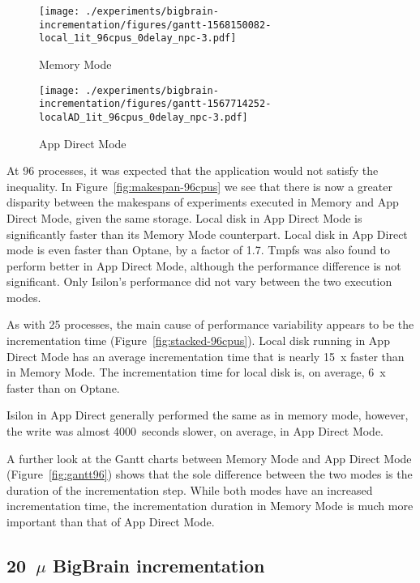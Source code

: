 \documentclass[conference]{IEEEtran}
\newcommand{\bigbrain}{BigBrain\xspace}
\begin{document}
\begin{figure*}
    \begin{subfigure}{\columnwidth}
        \centering
    \texttt{[image: ./experiments/bigbrain-incrementation/figures/gantt-1568150082-local\_1it\_96cpus\_0delay\_npc-3.pdf]}
    \caption{Memory Mode}
\end{subfigure}
\begin{subfigure}{\columnwidth}
        \centering
    \texttt{[image: ./experiments/bigbrain-incrementation/figures/gantt-1567714252-localAD\_1it\_96cpus\_0delay\_npc-3.pdf]}
    \caption{App Direct Mode}
\end{subfigure}
\caption{Gantt charts for local disk processing 125 blocks of the 40$\mu$m BigBrain using 96 processes with no delay}\label{fig:gantt96}
\end{figure*}

At 96 processes, it was expected that the application would not satisfy the inequality.
In Figure~\ref{fig:makespan-96cpus} we see that there is now a greater disparity between the
makespans of experiments executed in Memory and App Direct Mode, given the same storage. Local disk
in App Direct Mode is significantly faster than its Memory Mode counterpart. Local disk in App Direct
mode is even faster than Optane, by a factor of 1.7. Tmpfs was also found to perform better in App Direct Mode, although
the performance difference is not significant. Only Isilon's performance did not vary between the
two execution modes.

As with 25 processes, the main cause of performance variability appears to be the incrementation
time (Figure~\ref{fig:stacked-96cpus}). Local disk running in App Direct Mode has an average
incrementation time that is nearly 15~x faster than in Memory Mode. The incrementation time
for local disk is, on average, 6~x faster than on Optane.

Isilon in App Direct generally performed the same as in memory mode, however, the write
was almost 4000~seconds slower, on average, in App Direct Mode.

A further look at the Gantt charts between Memory Mode and App Direct Mode (Figure~\ref{fig:gantt96})
shows that the sole difference between the two modes is the duration of the incrementation step.
While both modes have an increased incrementation time, the incrementation duration in
Memory Mode is much more important than that of App Direct Mode.

\subsection{20~$\mu$ \bigbrain incrementation}
\end{document}
